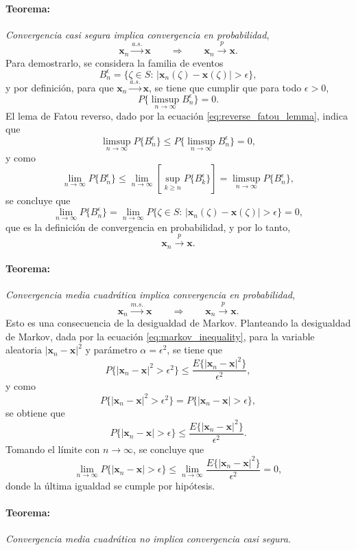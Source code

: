 \documentclass[a4paper]{report}
\newcommand{\x}{\mathbf{x}}
\begin{document}
\paragraph{Teorema:} \emph{Convergencia casi segura implica convergencia en probabilidad},
\[
 \x_n\overset{a.s.}{\longrightarrow}\x\qquad\Rightarrow\qquad\x_n\overset{p}{\longrightarrow}\x.
\]
Para demostrarlo, se considera la familia de eventos
\[
  B_n^\epsilon=\{\zeta\in S:\,|\x_n(\zeta)-\x(\zeta)|>\epsilon\},
\]
y por definición, para que \(\x_n\overset{a.s.}{\longrightarrow}\x\), se tiene que cumplir que para todo \(\epsilon>0\), 
\[
 P\{\limsup_{n\to\infty}B_n^\epsilon\}=0.
\]
El lema de Fatou reverso, dado por la ecuación \ref{eq:reverse_fatou_lemma}, indica que
\[
 \limsup_{n\to\infty}P\{B_n^\epsilon\}\leq P\{\limsup_{n\to\infty}B_n^\epsilon\}=0,
\]
y como
\[
 \lim_{n\to\infty}P\{B_n^\epsilon\}\leq\lim_{n\to\infty}\left[\sup_{k\geq n}P\{B_k^\epsilon\}\right]=\limsup_{n\to\infty}P\{B_n^\epsilon\},
\]
se concluye que
\[
 \lim_{n\to\infty}P\{B_n^\epsilon\}=\lim_{n\to\infty}P\{\zeta\in S:\,|\x_n(\zeta)-\x(\zeta)|>\epsilon\}=0,
\]
que es la definición de convergencia en probabilidad, y por lo tanto,
\[
 \x_n\overset{p}{\longrightarrow}\x.
\]

\paragraph{Teorema:} \emph{Convergencia media cuadrática implica convergencia en probabilidad},
\[
 \x_n\overset{m.s.}{\longrightarrow}\x\qquad\Rightarrow\qquad\x_n\overset{p}{\longrightarrow}\x.
\]
Esto es una consecuencia de la desigualdad de Markov. Planteando la desigualdad de Markov, dada por la ecuación \ref{eq:markov_inequality}, para la variable aleatoria \(|\x_n-\x|^2\) y parámetro \(\alpha=\epsilon^2\), se tiene que
\[
 P\{|\x_n-\x|^2>\epsilon^2\}\leq\frac{E\{|\x_n-\x|^2\}}{\epsilon^2},
\]
y como
\[
 P\{|\x_n-\x|^2>\epsilon^2\}=P\{|\x_n-\x|>\epsilon\},
\]
se obtiene que
\[
 P\{|\x_n-\x|>\epsilon\}\leq\frac{E\{|\x_n-\x|^2\}}{\epsilon^2}.
\]
Tomando el límite con \(n\to\infty\), se concluye que
\[
 \lim_{n\to\infty}P\{|\x_n-\x|>\epsilon\}\leq\lim_{n\to\infty}\frac{E\{|\x_n-\x|^2\}}{\epsilon^2}=0,
\]
donde la última igualdad se cumple por hipótesis.

\paragraph{Teorema:} \emph{Convergencia media cuadrática no implica convergencia casi segura}. 
\end{document}
